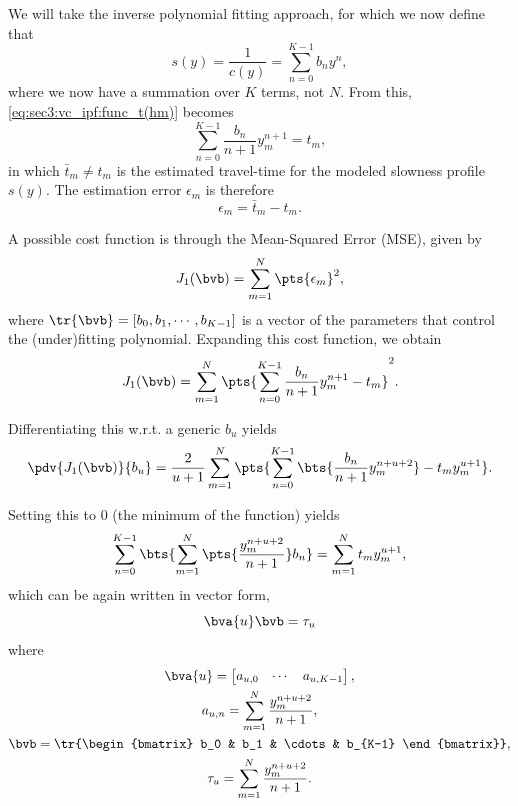 We will take the inverse polynomial fitting approach, for which we now define that
\begin{equation}
	s(y) = \frac{1}{c(y)} = \sum_{n=0}^{K-1} b_n y^n,
\end{equation}
where we now have a summation over $K$ terms, not $N$. From this, \cref{eq:sec3:vc_ipf:func_t(hm)} becomes
\begin{equation}
	\sum_{n=0}^{K-1} \frac{b_n}{n+1} y_m^{n+1} = t_m,
\end{equation}
in which $\bar{t}_m \neq t_m$ is the estimated travel-time for the modeled slowness profile $s(y)$. The estimation error $\epsilon_m$ is therefore
\begin{equation}
	\epsilon_m = \bar{t}_m - t_m.
\end{equation}

A possible cost function is through the Mean-Squared Error (MSE), given by
\begin{equation}
	J_1(\bvb) = \sum_{m=1}^{N} \pts{\epsilon_m}^2,
\end{equation}
where $\tr{\bvb} = [b_0,b_1,\cdots,b_{K-1}]$ is a vector of the parameters that control the (under)fitting polynomial. Expanding this cost function, we obtain
\begin{equation}
	J_1(\bvb) = \sum_{m=1}^{N} \pts{\sum_{n=0}^{K-1} \frac{b_n}{n+1} y_m^{n+1} - t_m}^2 .
\end{equation}

Differentiating this w.r.t. a generic $b_u$ yields %
\begin{equation}
	\pdv{J_1(\bvb)}{b_u} = \frac{2}{u+1} \sum_{m=1}^{N} \pts{ \sum_{n=0}^{K-1}\bts{ \frac{b_n}{n+1} y_m^{n+u+2} } - t_m y_m^{u+1} }.
\end{equation}

Setting this to $0$ (the minimum of the function) yields
\begin{equation}
	\sum_{n=0}^{K-1}\bts{ \sum_{m=1}^{N} \pts{ \frac{y_m^{n+u+2}}{n+1} } b_n } = \sum_{m=1}^{N} t_m y_m^{u+1},
\end{equation}
which can be again written in vector form,
\begin{equation}
	\bva{u} \bvb = \tau_u
\end{equation}
where
\begin{subequations}
	\begin{gather}
		\bva{u} = \begin{bmatrix}
			a_{u,0} & \cdots & a_{u,K-1}
		\end{bmatrix}, \\
		a_{u,n} = \sum_{m=1}^{N} \frac{y_m^{n+u+2}}{n+1}, \\
		\bvb = \tr{\begin{bmatrix}
				b_0 & b_1 & \cdots & b_{K-1}
		\end{bmatrix}}, \\
		\tau_u = \sum_{m=1}^{N}\frac{y_m^{n+u+2}}{n+1}.
	\end{gather}
\end{subequations}

